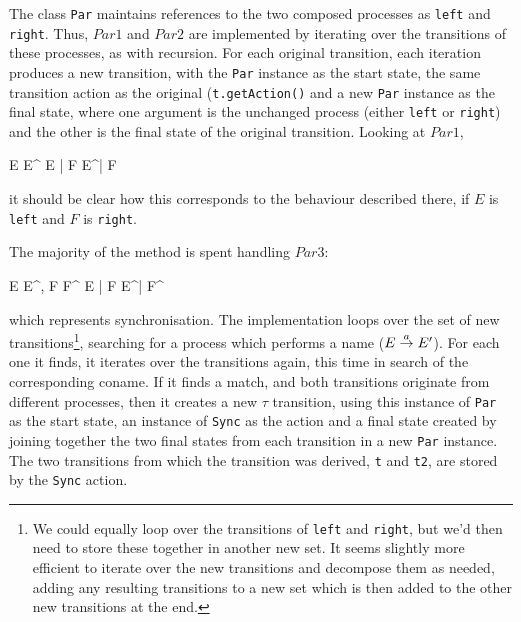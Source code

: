 The class \texttt{Par} maintains references to the two composed
processes as \texttt{left} and \texttt{right}.  Thus, $Par1$ and
$Par2$ are implemented by iterating over the transitions of these
processes, as with recursion.  For each original transition, each
iteration produces a new transition, with the \texttt{Par} instance as
the start state, the same transition action as the original
(\texttt{t.getAction()} and a new \texttt{Par} instance as the final
state, where one argument is the unchanged process (either
\texttt{left} or \texttt{right}) and the other is the final state of
the original transition.  Looking at $Par1$,

\begin{center}
     {E \derives{\alpha} E^\prime}
     {E \;|\; F \derives{\alpha} E^\prime \;|\; F}
     {}
\end{center}

\noindent it should be clear how this corresponds to the behaviour
described there, if $E$ is \texttt{left} and $F$ is \texttt{right}.

The majority of the method is spent handling $Par3$:

\begin{center}
      {E  E^\prime,
        F  F^\prime}
      {E \;|\; F \derives{\tau} E^\prime \;|\; F^\prime}
      {}
\end{center}

\noindent which represents synchronisation.  The implementation loops
over the set of new transitions\footnote{We could equally loop over
  the transitions of \texttt{left} and \texttt{right}, but we'd then
  need to store these together in another new set.  It seems slightly
  more efficient to iterate over the new transitions and decompose
  them as needed, adding any resulting transitions to a new set which
  is then added to the other new transitions at the end.}, searching
for a process which performs a name ($E \stackrel{a}{\rightarrow} E^\prime$).  For
each one it finds, it iterates over the transitions again, this time
in search of the corresponding coname.  If it finds a match, and both
transitions originate from different processes, then it creates a new
$\tau$ transition, using this instance of \texttt{Par} as the start
state, an instance of \texttt{Sync} as the action and a final state
created by joining together the two final states from each transition
in a new \texttt{Par} instance.  The two transitions from which the
transition was derived, \texttt{t} and \texttt{t2}, are stored by the
\texttt{Sync} action.

